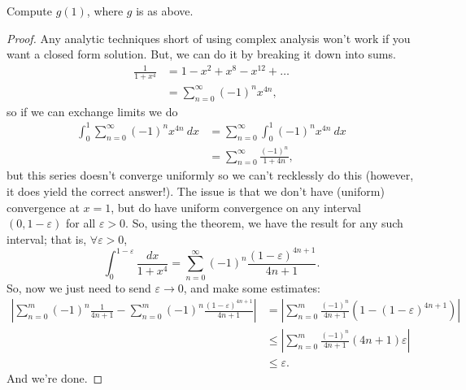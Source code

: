 \documentclass{notes}
\begin{document}
\begin{example}
  Compute $g(1)$, where $g$ is as above.
\end{example}
\begin{proof}
  Any analytic techniques short of using complex analysis won't work if you want a closed form
  solution. But, we can do it by breaking it down into sums.
  \begin{align*}
    \frac{1}{1 + x^4} &= 1 - x^2 + x^8 - x^{12} + \dots \\
                      &= \sum_{n=0}^\infty (-1)^n x^{4n},
  \end{align*}
  so if we can exchange limits we do
  \begin{align*}
    \int_0^1 \sum_{n=0}^\infty (-1)^n x^{4n}\ dx &= \sum_{n=0}^\infty \int_0^1 (-1)^n x^{4n}\ dx \\
                                                 &= \sum_{n=0}^\infty \frac{(-1)^n}{1 + 4n},
  \end{align*}
  but this series doesn't converge uniformly so we can't recklessly do this (however, it does yield
  the correct answer!). The issue is that we don't have (uniform) convergence at $x = 1$, but do
  have uniform convergence on any interval $(0, 1-\varepsilon)$ for all $\varepsilon > 0$. So, using
  the theorem, we have the result for any such interval; that is, $\forall \varepsilon > 0$, 
  $$\int_0^{1-\varepsilon} \frac{dx}{1 + x^4} = \sum_{n=0}^\infty (-1)^n \frac{(1 - \varepsilon)^{4n
  + 1}}{4n + 1}.$$  So, now we just need to send $\varepsilon\to 0$, and make some estimates:
  \begin{align*}
    \left| \sum_{n=0}^m (-1)^n \frac{1}{4n + 1} - \sum_{n=0}^m (-1)^n
    \frac{(1-\varepsilon)^{4n+1}}{4n + 1} \right| &= \left| \sum_{n=0}^m \frac{(-1)^n}{4n+1}\left( 1
  - (1-\varepsilon)^{4n+1}\right) \right| \\
  &\leq \left| \sum_{n=0}^m \frac{(-1)^n}{4n+1}(4n+1)\varepsilon \right| \\
  &\leq \varepsilon.
  \end{align*}
  And we're done.
\end{proof}
\end{document}
